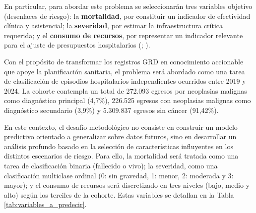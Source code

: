 En particular, para abordar este problema se seleccionarán tres variables objetivo (desenlaces de riesgo): la \textbf{mortalidad}, por constituir un indicador de efectividad clínica y asistencial; la \textbf{severidad}, por estimar la infraestructura crítica requerida; y el \textbf{consumo de recursos}, por representar un indicador relevante para el ajuste de presupuestos hospitalarios (\cite{Cid2024}; \cite{Metamodelo2024}).

Con el propósito de transformar los registros GRD en conocimiento accionable que apoye la planificación sanitaria, el problema será abordado como una tarea de clasificación de episodios hospitalarios independientes ocurridos entre 2019 y 2024. La cohorte contempla un total de 272.093 egresos por neoplasias malignas como diagnóstico principal (4,7\%), 226.525 egresos con neoplasias malignas como diagnóstico secundario (3,9\%) y 5.309.837 egresos sin cáncer (91,42\%).

En este contexto, el desafío metodológico no consiste en construir un modelo predictivo orientado a generalizar sobre datos futuros, sino en desarrollar un análisis profundo basado en la selección de características influyentes en los distintos escenarios de riesgo. Para ello, la mortalidad será tratada como una tarea de clasificación binaria (fallecido o vivo); la severidad, como una clasificación multiclase ordinal (0: sin gravedad, 1: menor, 2: moderada y 3: mayor); y el consumo de recursos será discretizado en tres niveles (bajo, medio y alto) según los terciles de la cohorte. Estas variables se detallan en la Tabla \ref{tab:variables_a_predecir}.

